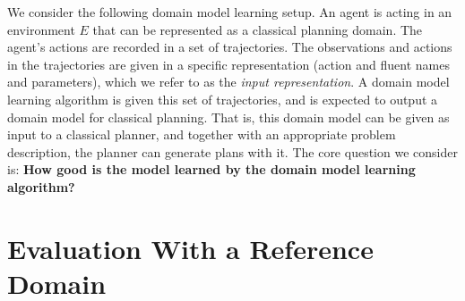 \documentclass[letterpaper]{article} %
\newcommand{\realm}{{\ensuremath{M^*}}\xspace}
\newif\ifaddcomments
\newcommand{\roni}[1]{\ifaddcomments{\textcolor{red}{[Roni: #1]}}\fi}
\newcommand{\mauro}[1]{\ifaddcomments{\textcolor{green}{[Mauro: #1]}}\fi}
\newcommand{\gregor}[1]{\ifaddcomments{\textcolor{orange}{[Gregor: #1]}}\fi}
\begin{document}
We consider the following domain model learning setup. 
An agent is acting in an environment $E$ that can be represented as a classical planning domain. 
The agent's actions are recorded in a set of trajectories. %
The observations and actions in the trajectories are given in a specific representation (action and fluent names and parameters), which we refer to as the \emph{input representation}. 
A domain model learning algorithm is given this set of trajectories, and is expected to output a domain model for classical planning. 
That is, this domain model can be given as input to a classical planner, and together with an appropriate problem description, the planner can generate plans with it.
The core question we consider is: \textbf{How good is the model learned by the domain model learning algorithm?}







\section{Evaluation With a Reference Domain}
\end{document}
